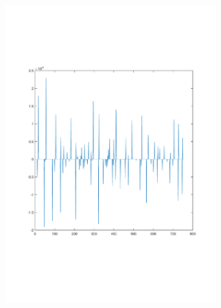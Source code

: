 \documentclass[sigconf]{acmart}
\begin{document}
\begin{figure}[tp]
\begin{subfigure}[t]{0.4\linewidth}
		\includegraphics[width=0.95\linewidth, trim={100 100 0 0}, clip]{fig/total_life_20}
		\label{fig:3.1b}
	\end{subfigure}
	\begin{subfigure}[t]{0.4\linewidth}
		\centering

\end{subfigure}
\end{figure}
\end{document}
